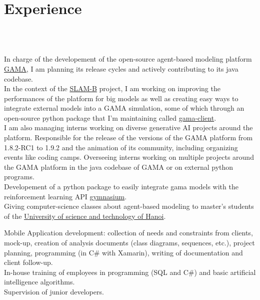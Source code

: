 \documentclass[letterpaper]{twentysecondcv - EN} %
\begin{document}
\section{Experience}
\\
\begin{twenty}
\\
	{
		In charge of the developement of the open-source agent-based modeling platform \href{https://gama-platform.org/}{GAMA}, I am planning its release cycles and actively contributing to its java codebase.\\
		In the context of the \href{https://www.slamb.fr/slamb-eng}{SLAM-B} project, I am working on improving the performances of the platform for big models as well as creating easy ways to integrate external models into a GAMA simulation, some of which through an open-source python package that I'm maintaining called \href{https://pypi.org/project/gama-client/}{gama-client}.\\
		I am also managing interns working on diverse generative AI projects around the platform.
	}
	{
		Responsible for the release of the versions of the GAMA platform from 1.8.2-RC1 to 1.9.2 and the animation of its community, including organizing events like coding camps.
		Overseeing interns working on multiple projects around the GAMA platform in the java codebase of GAMA or on external python programs.\\
		Developement of a python package to easily integrate gama models with the reinforcement learning API \href{https://gymnasium.farama.org/index.html}{gymnasium}.\\
		Giving computer-science classes about agent-based modeling to master's students of the 	\href{https://usth.edu.vn/en}{University of science and technology of Hanoi}.
	}
	
	{ 
		Mobile Application development: collection of needs and constraints from clients, mock-up, creation of analysis documents (class diagrams, sequences, etc.), project planning, programming (in C\# with Xamarin), writing of documentation and client follow-up.\\
		In-house training of employees in programming (SQL and C\#) and basic artificial intelligence algorithms. \\
		Supervision of junior developers.
	}
	 

\end{twenty}
\end{document}
